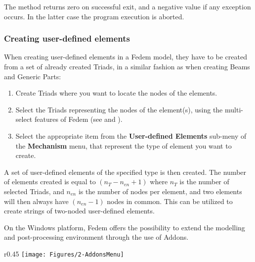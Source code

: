 The method returns zero on successful exit, and a negative value if any
exception occurs. In the latter case the program execution is aborted.

\subsubsection{Creating user-defined elements}

When creating user-defined elements in a Fedem model, they have to be created
from a set of already created Triads, in a similar fashion as when creating
Beams and Generic Parts:

\begin{enumerate}
\item Create Triads where you want to locate the nodes of the elements.
\item Select the Triads representing the nodes of the element(s), using the
  multi-select features of Fedem (see
   and ).
\item Select the appropriate item from the \textbf{User-defined Elements}
  sub-meny of the \textbf{Mechanism} menu, that represent the type of element
  you want to create.
\end{enumerate}

\clearpage
A set of user-defined elements of the specified type is then created.
The number of elements created is equal to $(n_T-n_{en}+1)$ where $n_T$ is the
number of selected Triads, and $n_{en}$ is the number of nodes per element,
and two elements will then always have $(n_{en}-1)$ nodes in common.
This can be utilized to create strings of two-noded user-defined elements.




On the Windows platform, Fedem offers the possibility to extend the modelling
and post-processing environment through the use of Addons.

\begin{wrapfigure}[10]{r}{0.45\textwidth} \vskip-3mm
  \texttt{[image: Figures/2-AddonsMenu]}
\end{wrapfigure}

